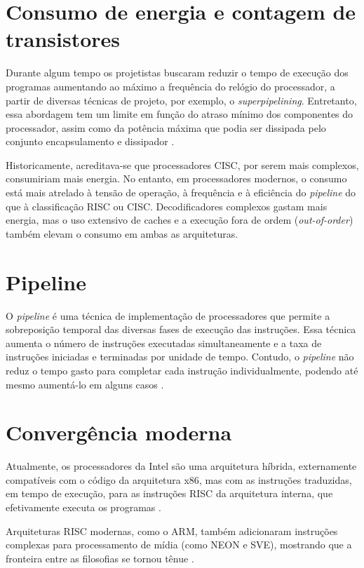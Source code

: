 \section{Consumo de energia e contagem de transistores}
Durante algum tempo os projetistas buscaram reduzir o tempo de execução dos programas aumentando ao máximo a frequência do relógio do processador, a partir de diversas técnicas de projeto, por exemplo, o \textit{superpipelining}. Entretanto, essa abordagem tem um limite em função do atraso mínimo dos componentes do processador, assim como da potência máxima que podia ser dissipada pelo conjunto encapsulamento e dissipador \cite{silva2024}.

Historicamente, acreditava-se que processadores CISC, por serem mais complexos, consumiriam mais energia. No entanto, em processadores modernos, o consumo está mais atrelado à tensão de operação, à frequência e à eficiência do \textit{pipeline} do que à classificação RISC ou CISC. Decodificadores complexos gastam mais energia, mas o uso extensivo de caches e a execução fora de ordem (\textit{out-of-order}) também elevam o consumo em ambas as arquiteturas.

\section{Pipeline}
O \textit{pipeline} é uma técnica de implementação de processadores que permite a sobreposição temporal das diversas fases de execução das instruções. Essa técnica aumenta o número de instruções executadas simultaneamente e a taxa de instruções iniciadas e terminadas por unidade de tempo. Contudo, o \textit{pipeline} não reduz o tempo gasto para completar cada instrução individualmente, podendo até mesmo aumentá-lo em alguns casos \cite{silva2024}.

\section{Convergência moderna}
Atualmente, os processadores da Intel são uma arquitetura híbrida, externamente compatíveis com o código da arquitetura x86, mas com as instruções traduzidas, em tempo de execução, para as instruções RISC da arquitetura interna, que efetivamente executa os programas \cite[p.~74]{silva2024}.

Arquiteturas RISC modernas, como o ARM, também adicionaram instruções complexas para processamento de mídia (como NEON e SVE), mostrando que a fronteira entre as filosofias se tornou tênue \cite{arm2024}.